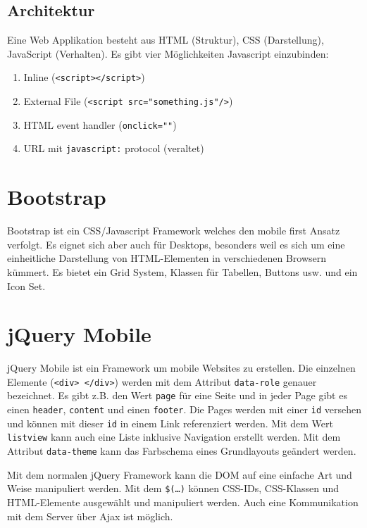 \subsection{Architektur}

Eine Web Applikation besteht aus HTML (Struktur), CSS (Darstellung), JavaScript (Verhalten). Es gibt vier Möglichkeiten Javascript einzubinden:
\begin{enumerate}
	\item Inline (\texttt{<script></script>})
	\item External File (\texttt{<script src="something.js"/>})
	\item HTML event handler (\texttt{onclick=""})
	\item URL mit \texttt{javascript:} protocol (veraltet)
\end{enumerate}

\section{Bootstrap}

Bootstrap ist ein CSS/Javascript Framework welches den mobile first Ansatz verfolgt. Es eignet sich aber auch für Desktops, besonders weil es sich um eine einheitliche Darstellung von HTML-Elementen in verschiedenen Browsern kümmert. Es bietet ein Grid System, Klassen für Tabellen, Buttons usw. und ein Icon Set.

\section{jQuery Mobile}

jQuery Mobile ist ein Framework um mobile Websites zu erstellen. Die einzelnen Elemente (\texttt{<div> \allowbreak </div>}) werden mit dem Attribut \texttt{data-role} genauer bezeichnet. Es gibt z.B. den Wert \texttt{page} für eine Seite und in jeder Page gibt es einen \texttt{header}, \texttt{content} und einen \texttt{footer}. Die Pages werden mit einer \texttt{id} versehen und können mit dieser \texttt{id} in einem Link referenziert werden. Mit dem Wert \texttt{listview} kann auch eine Liste inklusive Navigation erstellt werden. Mit dem Attribut \texttt{data-theme} kann das Farbschema eines Grundlayouts geändert werden.

Mit dem normalen jQuery Framework kann die DOM auf eine einfache Art und Weise manipuliert werden. Mit dem \texttt{\$(\dots)} können CSS-IDs, CSS-Klassen und HTML-Elemente ausgewählt und manipuliert werden. Auch eine Kommunikation mit dem Server über Ajax ist möglich. 

